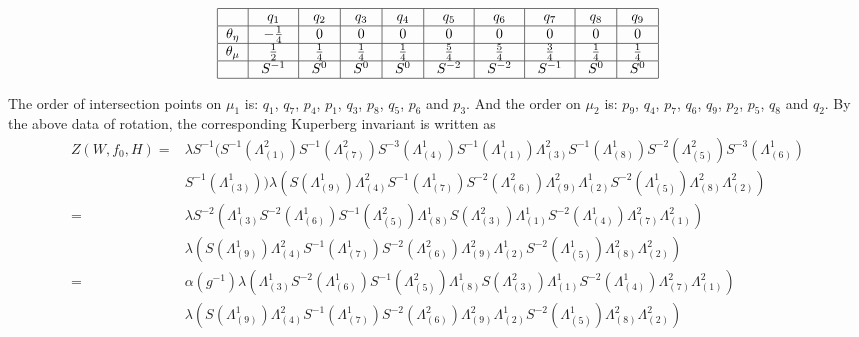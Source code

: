 \documentclass[12pt]{amsart}
\begin{document}
\[
\begin{tabular}{|c|c|c|c|c|c|c|c|c|c|c|} 
	\hline 
	& ~$q_1$~  & ~$q_2$~ & ~$q_3$~ & ~$q_4$~ & ~$q_5$~  & ~$q_6$~ & ~$q_7$~ & ~$q_8$~ & ~$q_9$~ \tabularnewline
	\hline 
	$\theta_\eta$ & ~$-\frac{1}{4}$~  & ~$0$~ & ~$0$~ & ~$0$~ & ~$0$~  & ~$0$~ & ~$0$~ & ~$0$~ & ~$0$~ \tabularnewline
	\hline 
	$\theta_\mu$ & ~$\frac{1}{2}$~  & ~$\frac{1}{4}$~ & ~$\frac{1}{4}$~ & ~$\frac{1}{4}$~ & ~$\frac{5}{4}$~  & ~$\frac{5}{4}$~ & ~$\frac{3}{4}$~ & ~$\frac{1}{4}$~ & ~$\frac{1}{4}$~ \tabularnewline
	\hline 
	& ~$S^{-1}$~  & ~$S^0$~ & ~$S^0$~ & ~$S^0$~ & ~$S^{-2}$~  & ~$S^{-2}$~ & ~$S^{-1}$~ & ~$S^0$~ & ~$S^0$~ \tabularnewline
	\hline
\end{tabular}
\]

The order of intersection points on $\mu_1$ is: $q_1$, $q_7$, $p_4$, $p_1$, $q_3$, $p_8$, $q_5$, $p_6$ and $p_3$. And the order on $\mu_2$ is: $p_9$, $q_4$, $p_7$, $q_6$, $q_9$, $p_2$, $p_5$, $q_8$ and $q_2$. By the above data of rotation, the corresponding Kuperberg invariant is written as   
\[
\begin{aligned}
Z(W, f_0, H)=&\lambda S^{-1}(S^{-1}(\Lambda^2_{(1)})S^{-1}(\Lambda^2_{(7)})S^{-3}(\Lambda^1_{(4)})S^{-1}(\Lambda^1_{(1)})\Lambda^2_{(3)}S^{-1}(\Lambda^1_{(8)})S^{-2}(\Lambda^2_{(5)})S^{-3}(\Lambda^1_{(6)})\\
&S^{-1}(\Lambda^1_{(3)}))\lambda(S(\Lambda^1_{(9)})\Lambda^2_{(4)}S^{-1}(\Lambda^1_{(7)})S^{-2}(\Lambda^2_{(6)})\Lambda^2_{(9)}\Lambda^1_{(2)}S^{-2}(\Lambda^1_{(5)})\Lambda^2_{(8)}\Lambda^2_{(2)})\\
=&\lambda S^{-2}(\Lambda^1_{(3)}S^{-2}(\Lambda^1_{(6)})S^{-1}(\Lambda^2_{(5)})\Lambda^1_{(8)}S(\Lambda^2_{(3)})\Lambda^1_{(1)}S^{-2}(\Lambda^1_{(4)})\Lambda^2_{(7)}\Lambda^2_{(1)})\\
&\lambda(S(\Lambda^1_{(9)})\Lambda^2_{(4)}S^{-1}(\Lambda^1_{(7)})S^{-2}(\Lambda^2_{(6)})\Lambda^2_{(9)}\Lambda^1_{(2)}S^{-2}(\Lambda^1_{(5)})\Lambda^2_{(8)}\Lambda^2_{(2)})\\
=&\alpha(g^{-1})\lambda (\Lambda^1_{(3)}S^{-2}(\Lambda^1_{(6)})S^{-1}(\Lambda^2_{(5)})\Lambda^1_{(8)}S(\Lambda^2_{(3)})\Lambda^1_{(1)}S^{-2}(\Lambda^1_{(4)})\Lambda^2_{(7)}\Lambda^2_{(1)})\\
&\lambda(S(\Lambda^1_{(9)})\Lambda^2_{(4)}S^{-1}(\Lambda^1_{(7)})S^{-2}(\Lambda^2_{(6)})\Lambda^2_{(9)}\Lambda^1_{(2)}S^{-2}(\Lambda^1_{(5)})\Lambda^2_{(8)}\Lambda^2_{(2)})
\end{aligned}
\]
\end{document}

